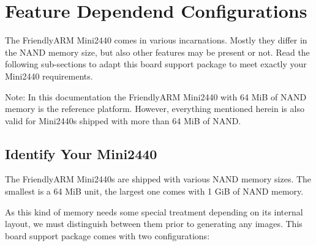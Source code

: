 %
%
%
%
%
%
%

\section{Feature Dependend Configurations}	\label{sec:featuremini2440}

The FriendlyARM Mini2440 comes in various incarnations. Mostly they differ in
the NAND memory size, but also other features may be present or not. Read the
following sub-sections to adapt this board support package to meet exactly
your Mini2440 requirements.

Note: In this documentation the FriendlyARM Mini2440 with 64 MiB of NAND
memory is the reference platform. However, everything mentioned herein is also
valid for Mini2440s shipped with more than 64 MiB of NAND.

\subsection{Identify Your Mini2440}		\label{sec:identifymini2440}

The FriendlyARM Mini2440s are shipped with various NAND memory sizes. The
smallest is a 64 MiB unit, the largest one comes with 1 GiB of NAND memory.

As this kind of memory needs some special treatment depending on its internal
layout, we must distinguish between them prior to generating any images. This board
support package comes with two configurations:


